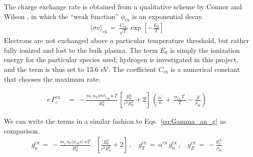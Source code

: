 The charge exchange rate is obtained from a qualitative scheme by Connor and Wilson \cite{connor_review_2000}, in which the ``weak function'' $\phi_\text{cx}$ is an exponential decay.
\begin{align} %
	\langle \sigma v\rangle_\text{cx} \,=\, \frac{C_\text{cx}}{\sqrt{T}} \,
		\exp\left[-\frac{E_0}{T}\right] \label{eq:cx_rate}
\end{align}
Electrons are not exchanged above a particular temperature threshold, but rather fully ionized and lost to the bulk plasma.
The term $E_0$ is simply the ionization energy for the particular species used; hydrogen is investigated in this project, and the term is thus set to 13.6 eV.
The coefficient $C_\text{cx}$ is a numerical constant that chooses the maximum rate.

\begin{align} %
	e\,\Gamma_e^\text{cx} \,&=\,
		-\frac{m_i \,n_0 \langle\sigma v\rangle_\text{cx} \, n\,T}{B_\theta^2}
		\, \left[\frac{B_\theta^2}{\epsilon^2 B_\phi^2} + 2\right] \,
		\left(\frac{n^\prime}{n} \,+\, \frac{\alpha_\text{cx}\,T^\prime}
		{T} - \frac{Z}{\rho_{\theta i}}\right) \label{eq:Gamma_cx}
\end{align}

We can write the terms in a similar fashion to Eqs.~\ref{eq:Gamma_an_g} as comparison.
\begin{align} %
	g_n^\text{cx} \,=\, -\frac{m_i \,n_0 \langle\sigma_\text{cx} v\rangle \,n T}
		{B_\theta^2}& \left[\frac{B_\theta^2}{\epsilon^2 B_\phi^2} + 2\right]
		~,~~~~ g_T^\text{cx} \,=\, \alpha^\text{cx}\,g_n^\text{cx}~,~~~~
		g_Z^\text{cx} \,=\, -\frac{g_n^\text{cx}}{\rho_{\theta i}}
		\label{eq:g_cx}
\end{align}

